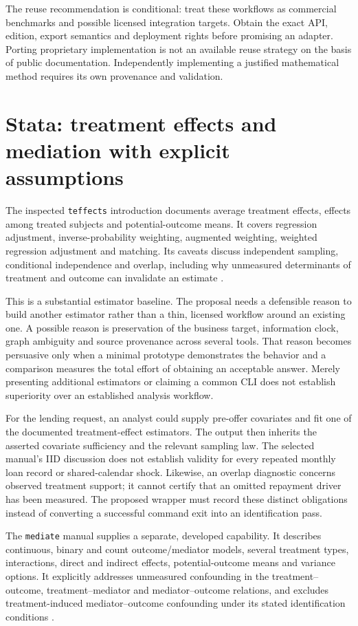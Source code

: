 The reuse recommendation is conditional: treat these workflows as commercial
benchmarks and possible licensed integration targets. Obtain the exact API,
edition, export semantics and deployment rights before promising an adapter.
Porting proprietary implementation is not an available reuse strategy on the
basis of public documentation. Independently implementing a justified
mathematical method requires its own provenance and validation.

\section{Stata: treatment effects and mediation with explicit assumptions}

The inspected \texttt{teffects} introduction documents average treatment effects,
effects among treated subjects and potential-outcome means. It covers regression
adjustment, inverse-probability weighting, augmented weighting, weighted
regression adjustment and matching. Its caveats discuss independent sampling,
conditional independence and overlap, including why unmeasured determinants of
treatment and outcome can invalidate an estimate
\citep{exec13_ci_stata_causal_intro}.

This is a substantial estimator baseline. The proposal needs a defensible reason
to build another estimator rather than a thin, licensed workflow around an
existing one. A possible reason is preservation of the business target,
information clock, graph ambiguity and source provenance across several tools.
That reason becomes persuasive only when a minimal prototype demonstrates the
behavior and a comparison measures the total effort of obtaining an acceptable
answer. Merely presenting additional estimators or claiming a common CLI does
not establish superiority over an established analysis workflow.

For the lending request, an analyst could supply pre-offer covariates and fit
one of the documented treatment-effect estimators. The output then inherits
the asserted covariate sufficiency and the relevant sampling law. The selected
manual's IID discussion does not establish validity for every repeated monthly
loan record or shared-calendar shock. Likewise, an overlap diagnostic concerns
observed treatment support; it cannot certify that an omitted repayment driver
has been measured. The proposed wrapper must record these distinct obligations
instead of converting a successful command exit into an identification pass.

The \texttt{mediate} manual supplies a separate, developed capability. It
describes continuous, binary and count outcome/mediator models, several treatment
types, interactions, direct and indirect effects, potential-outcome means and
variance options. It explicitly addresses unmeasured confounding in the
treatment--outcome, treatment--mediator and mediator--outcome relations, and
excludes treatment-induced mediator--outcome confounding under its stated
identification conditions \citep{exec13_ci_stata_mediate}.

